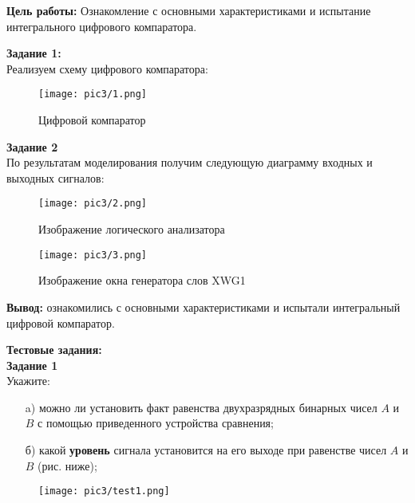 \documentclass[spec, och, labwork]{shiza}
\begin{document}

\textbf{Цель работы:} Ознакомление с основными характеристиками и испытание интегрального цифрового компаратора.

\textbf{Задание 1:}\\
Реализуем схему цифрового компаратора:

\begin{figure}[H]
    \centering
    \texttt{[image: pic3/1.png]}
    \caption{Цифровой компаратор}
\end{figure}

\textbf{Задание 2}\\

По результатам моделирования получим следующую диаграмму входных и выходных сигналов:

\begin{figure}[H]
    \centering
    \texttt{[image: pic3/2.png]}
    \caption{Изображение логического анализатора}
\end{figure}

\begin{figure}[H]
    \centering
    \texttt{[image: pic3/3.png]}
    \caption{Изображение окна генератора слов XWG1}
\end{figure}

\textbf{Вывод: } ознакомились с основными характеристиками и испытали интегральный цифровой компаратор.

\textbf{Тестовые задания:}\\

\textbf{Задание 1}\\
    Укажите:
    
    \begin{enumerate}
        \item[a)] можно ли установить факт равенства двухразрядных бинарных чисел $A$ и $B$ с помощью приведенного
        устройства сравнения;

        \item[б)] какой \textbf{уровень} сигнала установится на его выходе при равенстве чисел $A$ и $B$ (рис. ниже);

    \end{enumerate}
    
    \begin{figure}[H]
        \centering
        \texttt{[image: pic3/test1.png]}
        \caption{}
    \end{figure}
\end{document}

